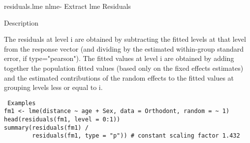 

residuals.lme {nlme}- Extract lme Residuals

Description

The residuals at level i are obtained by subtracting the fitted levels at that level from the response vector (and dividing by the estimated within-group standard error, if type="pearson"). The fitted values at level i are obtained by adding together the population fitted values (based only on the fixed effects estimates) and the estimated contributions of the random effects to the fitted values at grouping levels less or equal to i.
 
 
 \begin{framed}
 \begin{verbatim}
 Examples
fm1 <- lme(distance ~ age + Sex, data = Orthodont, random = ~ 1)
head(residuals(fm1, level = 0:1))
summary(residuals(fm1) /
        residuals(fm1, type = "p")) # constant scaling factor 1.432

\end{verbatim}
\end{framed}
